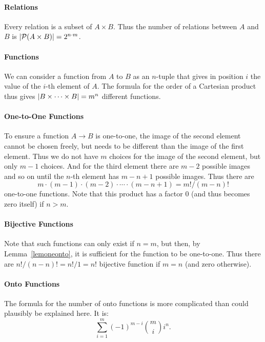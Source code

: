 \paragraph{Relations}
Every relation is a subset of $A\times B$. Thus the number of relations between $A$ and
$B$ is $\left|{\mathcal P}(A\times B)\right|=2^{n\cdot m}$.

\paragraph{Functions}
We can consider a function from $A$ to $B$ as an $n$-tuple that gives in position $i$
the value of the $i$-th element of $A$. The formula for the order of a Cartesian product
thus gives $\left|B\times \cdots\times B\right|=m^n$ different functions.

\paragraph{One-to-One Functions}
To ensure a function $A\to B$ is one-to-one, the image of the second element cannot be chosen
freely, but needs to be different than the image of the first element. Thus we do not
have $m$ choices for the image of the second element, but only $m-1$ choices. And for the third element there are $m-2$
possible images and so on until the $n$-th element has $m-n+1$ possible images. Thus there are
\[
m\cdot (m-1)\cdot (m-2)\cdot \cdots\cdot (m-n+1)=m!/(m-n)!
\]
one-to-one functions. Note that this product has a factor $0$ (and thus becomes zero
itself) if $n>m$.

\paragraph{Bijective Functions}
Note that such functions can only exist if $n=m$, but then, by Lemma~\ref{lemoneonto},
it is sufficient for the function to be one-to-one. Thus there
are
$n!/(n-n)!=n!/1=n!$
bijective function if $m=n$ (and zero otherwise).

\paragraph{Onto Functions}
The formula for the number of onto functions is more complicated than could plausibly be
explained here. It is:
\[
\sum_{i=1}^m (-1)^{m-i}{m\choose i}i^n.
\]


